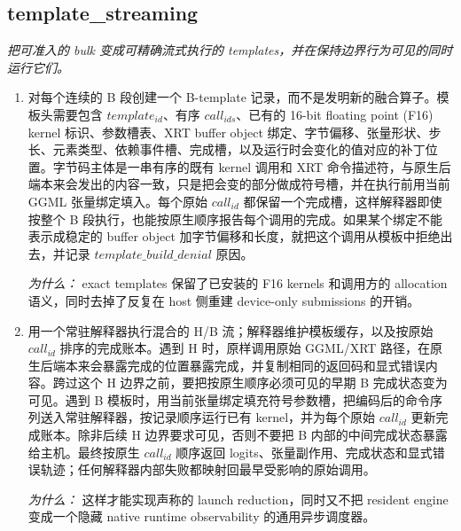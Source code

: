 \documentclass[10pt,a4paper]{article}
\begin{document}
\subsection*{template\_streaming}
\emph{把可准入的 bulk 变成可精确流式执行的 templates，并在保持边界行为可见的同时运行它们。}
\begin{enumerate}[leftmargin=*,start=3]
  \item 对每个连续的 B 段创建一个 B-template 记录，而不是发明新的融合算子。模板头需要包含 \(template_{id}\)、有序 \(call_{ids}\)、已有的 16-bit floating point (F16) kernel 标识、参数槽表、XRT buffer object 绑定、字节偏移、张量形状、步长、元素类型、依赖事件槽、完成槽，以及运行时会变化的值对应的补丁位置。字节码主体是一串有序的既有 kernel 调用和 XRT 命令描述符，与原生后端本来会发出的内容一致，只是把会变的部分做成符号槽，并在执行前用当前 GGML 张量绑定填入。每个原始 \(call_{id}\) 都保留一个完成槽，这样解释器即使按整个 B 段执行，也能按原生顺序报告每个调用的完成。如果某个绑定不能表示成稳定的 buffer object 加字节偏移和长度，就把这个调用从模板中拒绝出去，并记录 \(\mathit{template\_build\_denial}\) 原因。
\par\emph{为什么：} exact templates 保留了已安装的 F16 kernels 和调用方的 allocation 语义，同时去掉了反复在 host 侧重建 device-only submissions 的开销。
  \item 用一个常驻解释器执行混合的 H/B 流；解释器维护模板缓存，以及按原始 \(call_{id}\) 排序的完成账本。遇到 H 时，原样调用原始 GGML/XRT 路径，在原生后端本来会暴露完成的位置暴露完成，并复制相同的返回码和显式错误内容。跨过这个 H 边界之前，要把按原生顺序必须可见的早期 B 完成状态变为可见。遇到 B 模板时，用当前张量绑定填充符号参数槽，把编码后的命令序列送入常驻解释器，按记录顺序运行已有 kernel，并为每个原始 \(call_{id}\) 更新完成账本。除非后续 H 边界要求可见，否则不要把 B 内部的中间完成状态暴露给主机。最终按原生 \(call_{id}\) 顺序返回 logits、张量副作用、完成状态和显式错误轨迹；任何解释器内部失败都映射回最早受影响的原始调用。
\par\emph{为什么：} 这样才能实现声称的 launch reduction，同时又不把 resident engine 变成一个隐藏 native runtime observability 的通用异步调度器。
\end{enumerate}
\end{document}
